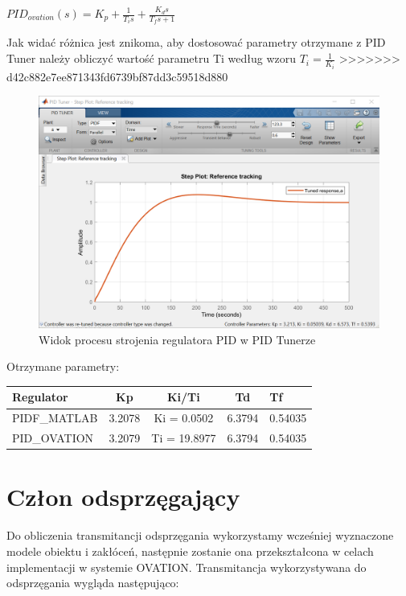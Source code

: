 \documentclass{mwrep}
\begin{document}
$PID_{ovation}(s) = K _ { p } + \frac { 1 } {  T _ { i } s } + \frac { K _ { d } s } { T _ { f } s + 1 }$
\vspace{3mm}

Jak widać różnica jest znikoma, aby dostosować parametry otrzymane z PID Tuner należy obliczyć wartość parametru Ti według wzoru $T_{i} = \frac{1}{K_{i}}$
>>>>>>> d42c882e7ee871343fd6739bf87dd3c59518d880

\begin{figure}[H]
\centering
\includegraphics[scale=0.4]{materialy/krystian_plots/pid_tuner.png}
\caption{Widok procesu strojenia regulatora PID w PID Tunerze}
\end{figure}

Otrzymane parametry:

\begin{table}[H]
\begin{tabular}{l|cccl}
Regulator    & Kp     & Ki/Ti        & Td     & Tf      \\ \hline
PIDF\_MATLAB & 3.2078 & Ki = 0.0502  & 6.3794 & 0.54035 \\
PID\_OVATION & 3.2079 & Ti = 19.8977 & 6.3794 & 0.54035
\end{tabular}
\end{table}
\newpage
\section{Człon odsprzęgający}
\label{Odsprzeganie}
Do obliczenia transmitancji odsprzęgania wykorzystamy wcześniej wyznaczone modele obiektu i zakłóceń, następnie zostanie ona przekształcona w celach implementacji w systemie OVATION.
Transmitancja wykorzystywana do odsprzęgania wygląda następująco:
\end{document}

